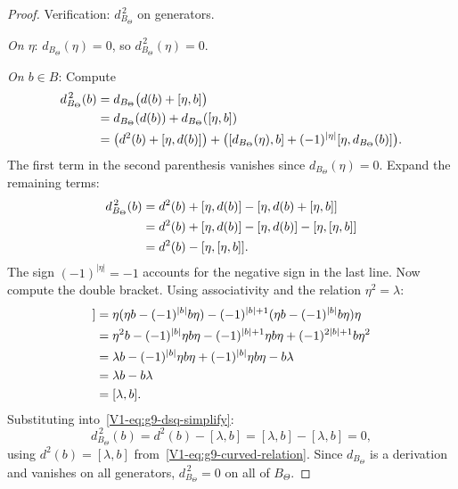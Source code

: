 \begin{proof}
Verification: $d_{B_\Theta}^{\,2}$ on generators.

\emph{On $\eta$}:
$d_{B_\Theta}(\eta) = 0$, so $d_{B_\Theta}^{\,2}(\eta) = 0$.

\emph{On $b \in B$}: Compute
\begin{align}
d_{B_\Theta}^{\,2}(b)
&= d_{B_\Theta}\bigl(d(b) + [\eta, b]\bigr) \notag \\
&= d_{B_\Theta}(d(b)) + d_{B_\Theta}([\eta, b]) \notag \\
&= \bigl(d^2(b) + [\eta, d(b)]\bigr)
 + \bigl([d_{B_\Theta}(\eta), b]
 + (-1)^{|\eta|}[\eta, d_{B_\Theta}(b)]\bigr). %
\end{align}
The first term in the second parenthesis vanishes since
$d_{B_\Theta}(\eta) = 0$. Expand the remaining terms:
\begin{align}
d_{B_\Theta}^{\,2}(b)
&= d^2(b) + [\eta, d(b)]
 - [\eta, d(b) + [\eta, b]] \notag \\
&= d^2(b) + [\eta, d(b)]
 - [\eta, d(b)] - [\eta, [\eta, b]] \notag \\
&= d^2(b) - [\eta, [\eta, b]]. %
\end{align}
The sign $(-1)^{|\eta|} = -1$ accounts for the negative sign in the
last line. Now compute the double bracket.
Using associativity and the relation $\eta^2 = \lambda$:
\begin{align}
[\eta, [\eta, b]]
&= \eta(\eta b - (-1)^{|b|}b\eta)
 - (-1)^{|b|+1}(\eta b - (-1)^{|b|}b\eta)\eta \notag \\
&= \eta^2 b - (-1)^{|b|}\eta b \eta
 - (-1)^{|b|+1}\eta b \eta + (-1)^{2|b|+1}b\eta^2 \notag \\
&= \lambda b - (-1)^{|b|}\eta b \eta
 + (-1)^{|b|}\eta b \eta - b\lambda \notag \\
&= \lambda b - b \lambda \notag \\
&= [\lambda, b]. %
\end{align}
Substituting into~\eqref{V1-eq:g9-dsq-simplify}:
\[
d_{B_\Theta}^{\,2}(b)
= d^2(b) - [\lambda, b]
= [\lambda, b] - [\lambda, b]
= 0,
\]
using $d^2(b) = [\lambda, b]$ from~\eqref{V1-eq:g9-curved-relation}.
Since $d_{B_\Theta}$ is a derivation and vanishes on all
generators, $d_{B_\Theta}^{\,2} = 0$ on all of $B_\Theta$.
\end{proof}

